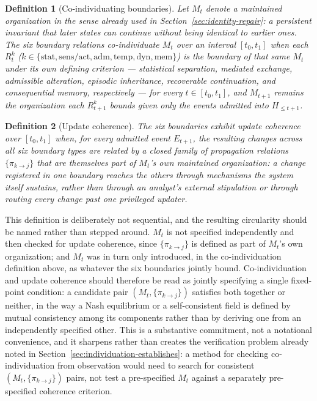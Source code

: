\documentclass[11pt]{article}
\newtheorem{definition}{Definition}
\begin{document}
\begin{definition}[Co-individuating boundaries]
Let $M_t$ denote a maintained organization in the sense already used in Section~\ref{sec:identity-repair}: a persistent invariant that later states can continue without being identical to earlier ones. The six boundary relations \emph{co-individuate} $M_t$ over an interval $[t_0,t_1]$ when each $R^k_t$ ($k\in\{\mathrm{stat},\mathrm{sens/act},\mathrm{adm},\mathrm{temp},\mathrm{dyn},\mathrm{mem}\}$) is the boundary of that same $M_t$ under its own defining criterion --- statistical separation, mediated exchange, admissible alteration, episodic inheritance, recoverable continuation, and consequential memory, respectively --- for every $t\in[t_0,t_1]$, and $M_{t+1}$ remains the organization each $R^k_{t+1}$ bounds given only the events admitted into $H_{\leq t+1}$.
\end{definition}

\begin{definition}[Update coherence]
The six boundaries exhibit \emph{update coherence} over $[t_0,t_1]$ when, for every admitted event $E_{t+1}$, the resulting changes across all six boundary types are related by a closed family of propagation relations $\{\pi_{k\to j}\}$ that are themselves part of $M_t$'s own maintained organization: a change registered in one boundary reaches the others through mechanisms the system itself sustains, rather than through an analyst's external stipulation or through routing every change past one privileged updater.
\end{definition}

This definition is deliberately not sequential, and the resulting circularity should be named rather than stepped around. $M_t$ is not specified independently and then checked for update coherence, since $\{\pi_{k\to j}\}$ is defined as part of $M_t$'s own organization; and $M_t$ was in turn only introduced, in the co-individuation definition above, as whatever the six boundaries jointly bound. Co-individuation and update coherence should therefore be read as jointly specifying a single fixed-point condition: a candidate pair $(M_t,\{\pi_{k\to j}\})$ satisfies both together or neither, in the way a Nash equilibrium or a self-consistent field is defined by mutual consistency among its components rather than by deriving one from an independently specified other. This is a substantive commitment, not a notational convenience, and it sharpens rather than creates the verification problem already noted in Section~\ref{sec:individuation-establishes}: a method for checking co-individuation from observation would need to search for consistent $(M_t,\{\pi_{k\to j}\})$ pairs, not test a pre-specified $M_t$ against a separately pre-specified coherence criterion.
\end{document}
